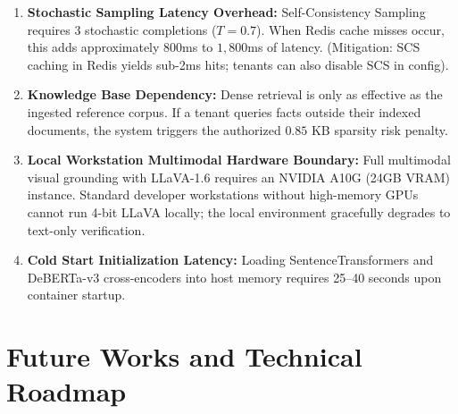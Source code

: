 \documentclass[11pt,a4paper]{article}
\begin{document}
\begin{enumerate}[leftmargin=*]
    \item \textbf{Stochastic Sampling Latency Overhead:} Self-Consistency Sampling requires 3 stochastic completions ($T=0.7$). When Redis cache misses occur, this adds approximately $800$ms to $1,800$ms of latency. (Mitigation: SCS caching in Redis yields sub-2ms hits; tenants can also disable SCS in config).
    \item \textbf{Knowledge Base Dependency:} Dense retrieval is only as effective as the ingested reference corpus. If a tenant queries facts outside their indexed documents, the system triggers the authorized $0.85$ KB sparsity risk penalty.
    \item \textbf{Local Workstation Multimodal Hardware Boundary:} Full multimodal visual grounding with LLaVA-1.6 requires an NVIDIA A10G (24GB VRAM) instance. Standard developer workstations without high-memory GPUs cannot run 4-bit LLaVA locally; the local environment gracefully degrades to text-only verification.
    \item \textbf{Cold Start Initialization Latency:} Loading SentenceTransformers and DeBERTa-v3 cross-encoders into host memory requires 25--40 seconds upon container startup.
\end{enumerate}

\section{Future Works and Technical Roadmap}
\end{document}

